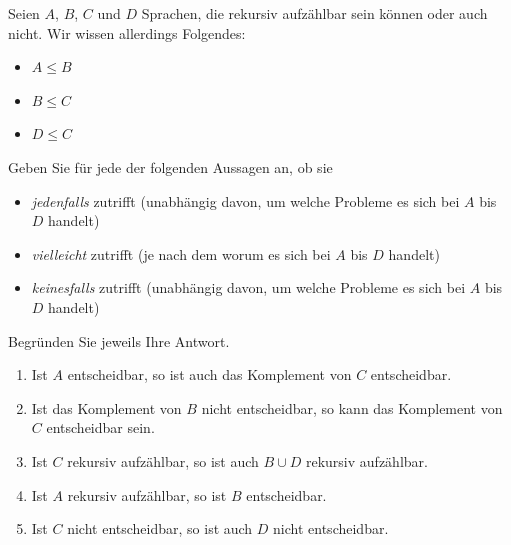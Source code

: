 \documentclass[10pt,a4paper]{scrartcl}
\begin{document}
\begin{question} 

Seien $A$, $B$, $C$ und $D$ Sprachen, die rekursiv aufz\"ahlbar sein k\"onnen oder auch nicht.
Wir wissen allerdings Folgendes:

\begin{itemize}
  \item  $A \le B$
  \item  $B \le C$
  \item  $D \le C$
\end{itemize}


Geben Sie f\"ur jede der folgenden Aussagen an, ob sie
 
\begin{itemize}
  \item \textit{jedenfalls} zutrifft (unabh\"angig davon, um welche Probleme es sich bei $A$ bis $D$ handelt)
  \item \textit{vielleicht} zutrifft (je nach dem worum es sich bei $A$ bis $D$ handelt)
  \item \textit{keinesfalls} zutrifft (unabh\"angig davon, um welche Probleme es sich bei $A$ bis $D$ handelt)
\end{itemize}

Begr\"unden Sie jeweils Ihre Antwort.


\begin{enumerate}
  \item Ist $A$ entscheidbar, so ist auch das Komplement von $C$ entscheidbar.

  \item Ist das Komplement von $B$ nicht entscheidbar, so kann das Komplement von $C$ entscheidbar sein.

  \item Ist $C$ rekursiv aufz\"ahlbar, so ist auch $B \cup D$ rekursiv aufz\"ahlbar.

  \item Ist $A$ rekursiv aufz\"ahlbar, so ist $B$ entscheidbar.

  \item Ist $C$ nicht entscheidbar, so ist auch $D$ nicht entscheidbar.
\end{enumerate}

\end{question}
\end{document}
